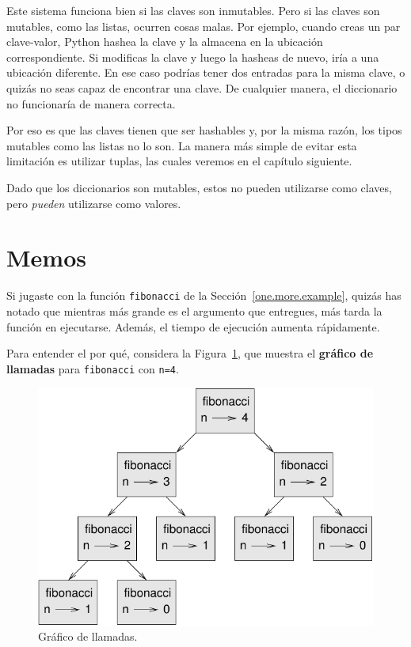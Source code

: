 \documentclass[10pt]{book}
\begin{document}
Este sistema funciona bien si las claves son inmutables.  Pero si las
claves son mutables, como las listas, ocurren cosas malas.  Por ejemplo,
cuando creas un par clave-valor, Python hashea la clave y
la almacena en la ubicación correspondiente.  Si modificas la
clave y luego la hasheas de nuevo, iría a una ubicación diferente.
En ese caso podrías tener dos entradas para la misma clave,
o quizás no seas capaz de encontrar una clave.  De cualquier manera, el
diccionario no funcionaría de manera correcta.

Por eso es que las claves tienen que ser hashables y, por la misma razón, los tipos mutables como
las listas no lo son.  La manera más simple de evitar esta limitación es
utilizar tuplas, las cuales veremos en el capítulo siguiente.

Dado que los diccionarios son mutables, estos no pueden utilizarse como claves,
pero {\em pueden} utilizarse como valores.


\section{Memos}
\label{memoize}

Si jugaste con la función {\tt fibonacci} de la
Sección~\ref{one.more.example}, quizás has notado que mientras más grande
es el argumento que entregues, más tarda la función en ejecutarse.
Además, el tiempo de ejecución aumenta rápidamente. 

Para entender el por qué, considera la Figura~\ref{fig.fibonacci}, que muestra
el {\bf gráfico de llamadas} para {\tt fibonacci} con {\tt n=4}.

\begin{figure}
\centerline
{\includegraphics[scale=0.7]{figs/fibonacci.pdf}}
\caption{Gráfico de llamadas.}
\label{fig.fibonacci}
\end{figure}
\end{document}

